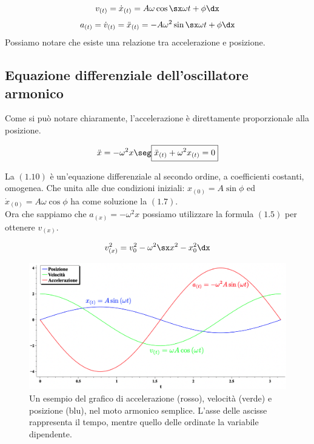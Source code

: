 \begin{equation}
v_{(t)} = \dot x_{(t)} = A\omega\cos\sx\omega t +\phi\dx
\end{equation}
\begin{equation}
a_{(t)} = \dot v_{(t)} = \ddot x_{(t)} = -A\omega^2\sin\sx\omega t +\phi\dx
\end{equation}
Possiamo notare che esiste una relazione tra accelerazione e posizione.


\subsection{Equazione differenziale dell'oscillatore armonico}
Come si può notare chiaramente, l'accelerazione è direttamente proporzionale alla posizione.


\begin{equation}
\ddot x = -\omega^2x\seg \boxed{\ddot x_{(t)} + \omega^2x_{(t)} = 0}
\end{equation}

La $(1.10)$ è un'equazione differenziale al secondo ordine, a coefficienti costanti, omogenea. Che unita alle due condizioni iniziali: $x_{(0)} = A\sin\phi $ ed $\dot x_{(0)} = A\omega\cos\phi $ ha come soluzione la $(1.7)$.\\
Ora che sappiamo che $a_{(x)} = -\omega^2x$ possiamo utilizzare la formula $(1.5)$ per ottenere $v_{(x)}$.

\begin{equation}
v^2_{(x)} = v_0^2 - \omega^2\sx x^2 - x_0^2\dx
\end{equation}

\begin{figure}[htbp]
\begin{center}
\includegraphics[width=13cm]{images/Motoarm1.png} 
\caption{Un esempio del grafico di accelerazione (rosso), velocità (verde) e posizione (blu), nel moto armonico semplice. L'asse delle ascisse rappresenta il tempo, mentre quello delle ordinate la variabile dipendente.}
\label{default}
\end{center}
\end{figure}




